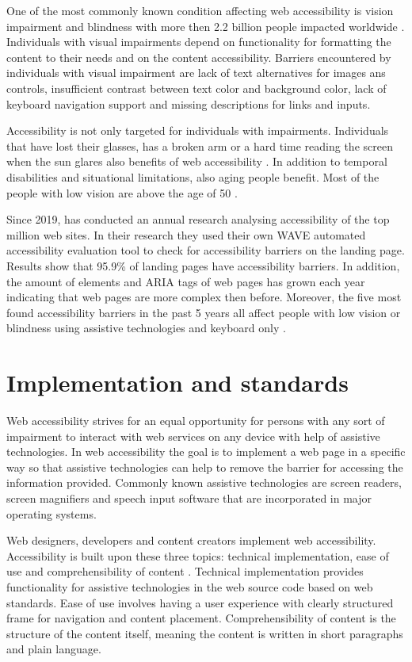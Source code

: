 One of the most commonly known condition affecting web accessibility is vision impairment and blindness with more then 2.2 billion people impacted worldwide \citep[Chapter~1]{whovision, webaccessibility}. Individuals with visual impairments depend on functionality for formatting the content to their needs and on the content accessibility. Barriers encountered by individuals with visual impairment are lack of text alternatives for images ans controls, insufficient contrast between text color and background color, lack of keyboard navigation support and missing descriptions for links and inputs. 

Accessibility is not only targeted for individuals with impairments. Individuals that have lost their glasses, has a broken arm or a hard time reading the screen when the sun glares also benefits of web accessibility \citep{w3cbarriers}. In addition to temporal disabilities and situational limitations, also aging people benefit. Most of the people with low vision are above the age of 50 \citep{whovision}.

Since 2019, \textcite{webaimmillions} has conducted an annual research analysing accessibility of the top million web sites. In their research they used their own WAVE automated accessibility evaluation tool to check for accessibility barriers on the landing page. Results show that 95.9\% of landing pages have accessibility barriers. In addition, the amount of elements and ARIA tags of web pages has grown each year indicating that web pages are more complex then before. Moreover, the five most found accessibility barriers in the past 5 years all affect people with low vision or blindness using assistive technologies and keyboard only \citep{webaimmillions}. 

\section{Implementation and standards}

Web accessibility strives for an equal opportunity for persons with any sort of impairment to interact with web services on any device with help of assistive technologies. In web accessibility the goal is to implement a web page in a specific way so that assistive technologies can help to remove the barrier for accessing the information provided. Commonly known assistive technologies are screen readers, screen magnifiers and speech input software that are incorporated in major operating systems.

Web designers, developers and content creators implement web accessibility. Accessibility is built upon these three topics: technical implementation, ease of use and comprehensibility of content \citep{webaccessibilitydefinition}. Technical implementation provides functionality for assistive technologies in the web source code based on web standards. Ease of use involves having a user experience with clearly structured frame for navigation and content placement. Comprehensibility of content is the structure of the content itself, meaning the content is written in short paragraphs and plain language. 

